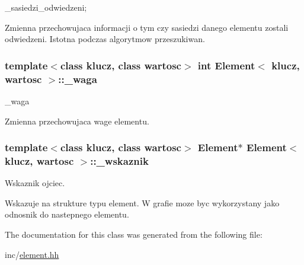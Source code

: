 \+\_\+sasiedzi\+\_\+odwiedzeni; 

Zmienna przechowujaca informacji o tym czy sasiedzi danego elementu zostali odwiedzeni. Istotna podczas algorytmow przeszukiwan. \hypertarget{class_element_a92ee233e04730ab987cf1082cfcd43cd}{
\subsubsection[{\+\_\+waga}]{\setlength{\rightskip}{0pt plus 5cm}template$<$class klucz, class wartosc$>$ int {\bf Element}$<$ klucz, wartosc $>$\+::\+\_\+waga\hspace{0.3cm}{\ttfamily [private]}}}\label{class_element_a92ee233e04730ab987cf1082cfcd43cd}


\+\_\+waga 

Zmienna przechowujaca wage elementu. \hypertarget{class_element_a990b8110554103571bc5731545db526f}{
\subsubsection[{\+\_\+wskaznik}]{\setlength{\rightskip}{0pt plus 5cm}template$<$class klucz, class wartosc$>$ {\bf Element}$\ast$ {\bf Element}$<$ klucz, wartosc $>$\+::\+\_\+wskaznik\hspace{0.3cm}{\ttfamily [private]}}}\label{class_element_a990b8110554103571bc5731545db526f}


Wskaznik ojciec. 

Wskazuje na strukture typu element. W grafie moze byc wykorzystany jako odnosnik do nastepnego elementu. 

The documentation for this class was generated from the following file\+:\begin{DoxyCompactItemize}
\item 
inc/\hyperlink{element_8hh}{element.\+hh}\end{DoxyCompactItemize}
